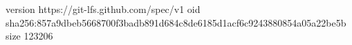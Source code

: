 version https://git-lfs.github.com/spec/v1
oid sha256:857a9dbeb5668700f3badb891d684c8de6185d1acf6c9243880854a05a22be5b
size 123206
